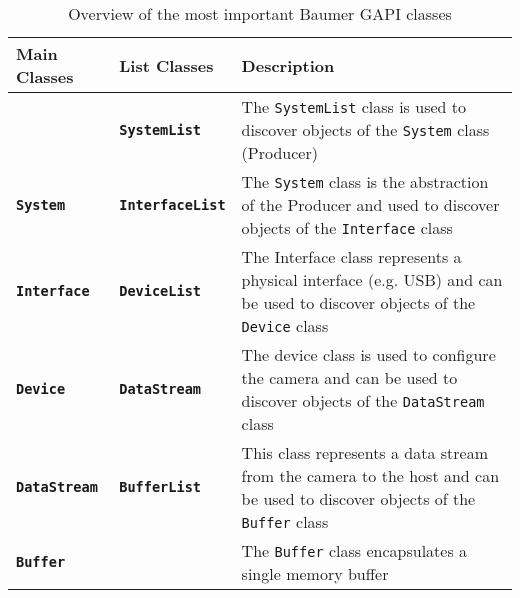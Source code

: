 \begin{table}[hb]
  \caption{Overview of the most important Baumer GAPI classes}
  \label{tab:baumer_gapi}
  \centering
  \begin{tabular}{llp{8.5cm}}
    \toprule
    \textbf{Main Classes} & \textbf{List Classes} & \textbf{Description} \\
    \midrule
     & \textbf{\texttt{SystemList}} & The \texttt{SystemList} class is used to discover objects of the \texttt{System} class (Producer) \\
    \midrule
    \textbf{\texttt{System}} & \textbf{\texttt{InterfaceList}} & The \texttt{System} class is the abstraction of the Producer and used to discover objects of the \texttt{Interface} class \\
    \midrule
    \textbf{\texttt{Interface}} & \textbf{\texttt{DeviceList}} & The Interface class represents a physical interface (e.g. USB) and can be used to discover objects of the \texttt{Device} class \\
    \midrule
    \textbf{\texttt{Device}} & \textbf{\texttt{DataStream}} & The device class is used to configure the camera and can be used to discover objects of the \texttt{DataStream} class \\
    \midrule
    \textbf{\texttt{DataStream}} & \textbf{\texttt{BufferList}} & This class represents a data stream from the camera to the host and can be used to discover objects of the \texttt{Buffer} class \\
    \midrule
    \textbf{\texttt{Buffer}} &  & The \texttt{Buffer} class encapsulates a single memory buffer \\
    \bottomrule
  \end{tabular}
\end{table}

